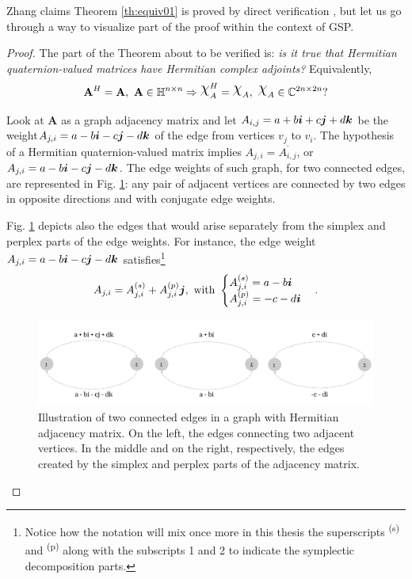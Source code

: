 Zhang claims Theorem \ref{th:equiv01} is proved by direct verification \cite{zhang1997quaternions}, but let us go through a way to visualize part of the proof within the context of GSP.
 
\begin{proof}
The part of the Theorem about to be verified is: \emph{is it true that Hermitian quaternion-valued matrices have Hermitian complex adjoints?} Equivalently,
\begin{equation}
\mathbf{A}^H = \mathbf{A}, \ \mathbf{A} \in \mathbb{H}^{n \times n} \Rightarrow
\rchi_{A}^H = \rchi_{A}, \ \rchi_{A} \in \mathbb{C}^{2n \times 2n}?
\end{equation}

Look at $\mathbf{A}$ as a graph adjacency matrix and let $A_{i,j} = a + b\boldsymbol{i} + c\boldsymbol{j} + d\boldsymbol{k}$ be the weight$A_{j,i} = a - b\boldsymbol{i} - c\boldsymbol{j} - d\boldsymbol{k}$ of the edge from vertices $v_j$ to $v_i$. The hypothesis of a Hermitian quaternion-valued matrix implies $A_{j,i} = \overline{A_{i,j}}$, or $A_{j,i} = a - b\boldsymbol{i} - c\boldsymbol{j} - d\boldsymbol{k}$. The edge weights of such graph, for two connected edges, are represented in Fig. \ref{fig:hermitian-crop-2}: any pair of adjacent vertices are connected by two edges in opposite directions and with conjugate edge weights.

Fig. \ref{fig:hermitian-crop-2} depicts also the edges that would arise separately from the simplex and perplex parts of the edge weights. For instance, the edge weight $A_{j,i} = a - b\boldsymbol{i} - c\boldsymbol{j} - d\boldsymbol{k}$ satisfies\footnote{Notice how the notation will mix once more in this thesis the superscripts \textsuperscript{(s)} and \textsuperscript{(p)} along with the subscripts 1 and 2 to indicate the symplectic decomposition parts.}
\begin{equation}
A_{j,i} = A^{(s)}_{j,i} + A^{(p)}_{j,i} \boldsymbol{j}, \text{ with }
\begin{cases}
A^{(s)}_{j,i} = a - b\boldsymbol{i} \\
A^{(p)}_{j,i} = -c -d \boldsymbol{i}
\end{cases}.
\end{equation}

\begin{figure}
\centering
\includegraphics[width=0.95\linewidth]{thesis/Figures/hermitian-crop-2.pdf}
\caption{Illustration of two connected edges in a graph with Hermitian adjacency matrix. On the left, the edges connecting two adjacent vertices. In the middle and on the right, respectively, the edges created by the simplex and perplex parts of the adjacency matrix.}
\label{fig:hermitian-crop-2}
\end{figure}


\end{proof}
